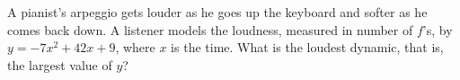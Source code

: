 A pianist's arpeggio gets louder as he goes up the keyboard and softer as he comes back down. A listener models the loudness, measured in number of $f$'s, by $y=-7x^2+42x+9$, where $x$ is the time. What is the loudest dynamic, that is, the largest value of $y$?

